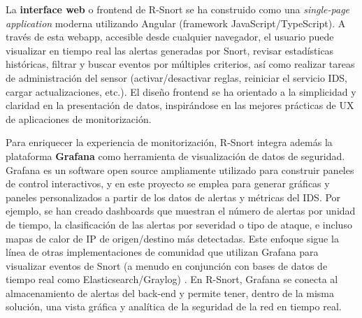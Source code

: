 \documentclass[11pt,a4paper,twoside]{report}
\begin{document}
La \textbf{interface web} o frontend de R-Snort se ha construido como una \textit{single-page application} moderna utilizando Angular (framework JavaScript/TypeScript). A través de esta webapp, accesible desde cualquier navegador, el usuario puede visualizar en tiempo real las alertas generadas por Snort, revisar estadísticas históricas, filtrar y buscar eventos por múltiples criterios, así como realizar tareas de administración del sensor (activar/desactivar reglas, reiniciar el servicio IDS, cargar actualizaciones, etc.). El diseño frontend se ha orientado a la simplicidad y claridad en la presentación de datos, inspirándose en las mejores prácticas de UX de aplicaciones de monitorización.\newline

Para enriquecer la experiencia de monitorización, R-Snort integra además la plataforma \textbf{Grafana} como herramienta de visualización de datos de seguridad. Grafana es un software open source ampliamente utilizado para construir paneles de control interactivos, y en este proyecto se emplea para generar gráficas y paneles personalizados a partir de los datos de alertas y métricas del IDS. Por ejemplo, se han creado dashboards que muestran el número de alertas por unidad de tiempo, la clasificación de las alertas por severidad o tipo de ataque, e incluso mapas de calor de IP de origen/destino más detectadas. Este enfoque sigue la línea de otras implementaciones de comunidad que utilizan Grafana para visualizar eventos de Snort (a menudo en conjunción con bases de datos de tiempo real como Elasticsearch/Graylog) \cite{GrafanaForum2020}. En R-Snort, Grafana se conecta al almacenamiento de alertas del back-end y permite tener, dentro de la misma solución, una vista gráfica y analítica de la seguridad de la red en tiempo real.\newline
\end{document}
